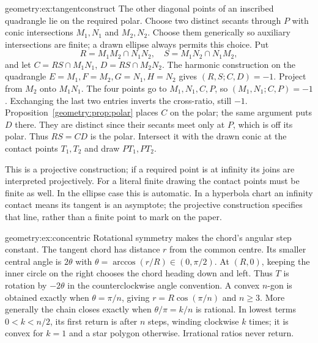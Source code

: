 \begin{solution}{geometry:ex:tangentconstruct}
\idea The other diagonal points of an inscribed quadrangle lie on the required polar.
\writeup Choose two distinct secants through $P$ with conic intersections $M_1,N_1$ and $M_2,N_2$. Choose them generically so auxiliary intersections are finite; a drawn ellipse always permits this choice. Put
\[
R=M_1M_2\cap N_1N_2,\quad S=M_1N_2\cap N_1M_2,
\]
and let $C=RS\cap M_1N_1$, $D=RS\cap M_2N_2$. The harmonic construction on the quadrangle $E=M_1,F=M_2,G=N_1,H=N_2$ gives $(R,S;C,D)=-1$. Project from $M_2$ onto $M_1N_1$. The four points go to $M_1,N_1,C,P$, so $(M_1,N_1;C,P)=-1$. Exchanging the last two entries inverts the cross-ratio, still $-1$. Proposition~\ref{geometry:prop:polar} places $C$ on the polar; the same argument puts $D$ there. They are distinct since their secants meet only at $P$, which is off its polar. Thus $RS=CD$ is the polar. Intersect it with the drawn conic at the contact points $T_1,T_2$ and draw $PT_1,PT_2$.

This is a projective construction; if a required point is at infinity its joins are interpreted projectively. For a literal finite drawing the contact points must be finite as well. In the ellipse case this is automatic. In a hyperbola chart an infinity contact means its tangent is an asymptote; the projective construction specifies that line, rather than a finite point to mark on the paper.
\end{solution}
\begin{solution}{geometry:ex:concentric}
\idea Rotational symmetry makes the chord's angular step constant.
\writeup The tangent chord has distance $r$ from the common centre. Its smaller central angle is $2\theta$ with $\theta=\arccos(r/R)\in(0,\pi/2)$. At $(R,0)$, keeping the inner circle on the right chooses the chord heading down and left. Thus $T$ is rotation by $-2\theta$ in the counterclockwise angle convention. A convex $n$-gon is obtained exactly when $\theta=\pi/n$, giving $r=R\cos(\pi/n)$ and $n\ge3$. More generally the chain closes exactly when $\theta/\pi=k/n$ is rational. In lowest terms $0<k<n/2$, its first return is after $n$ steps, winding clockwise $k$ times; it is convex for $k=1$ and a star polygon otherwise. Irrational ratios never return.
\end{solution}
